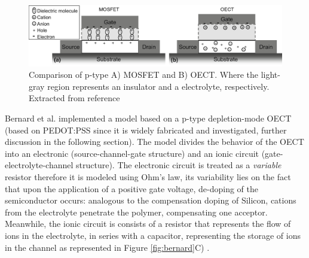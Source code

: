 \begin{figure}
  \centering
  \includegraphics[width=\textwidth]{Images/MOSFETvsOECTs.jpg}
  \caption{Comparison of p-type A) MOSFET and B) OECT. Where the light-gray region represents an insulator and a electrolyte, respectively. Extracted from reference  \cite{friedleinDevicePhysicsOrganic2018}}
  \label{fig:vsMOS}
\end{figure}

Bernard et al. implemented a model based on a p-type depletion-mode OECT (based on PEDOT:PSS since it is widely fabricated and investigated, further discussion in the following section). The model divides the behavior of the OECT into an electronic (source-channel-gate structure) and an ionic circuit (gate-electrolyte-channel structure). The electronic circuit is treated as a \textit{variable} resistor therefore it is modeled using Ohm's law, its variability lies on the fact that upon the application of a positive gate voltage, de-doping of the semiconductor occurs: analogous to the compensation doping of Silicon, cations from the electrolyte penetrate the polymer, compensating one acceptor. Meanwhile, the ionic circuit is consists of a resistor that represents the flow of ions in the electrolyte, in series with a capacitor, representing the storage of ions in the channel as represented in Figure \ref{fig:bernard}C) \cite{rivnayOrganicElectrochemicalTransistors2018}\cite{bernardsSteadyStateTransientBehavior2007}. 

